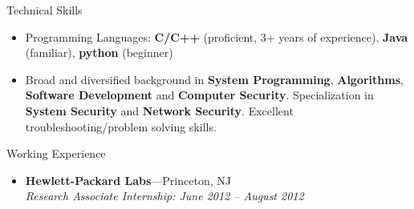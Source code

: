 \documentclass[11pt,oneside]{article}
\newenvironment{ressection}[1]{
	\vspace{4pt}
	{\fontfamily{phv}\selectfont\Large#1}
	\begin{itemize}
	\vspace{3pt}
}{
	\end{itemize}
}
\newcommand{\resitem}[1]{
	\vspace{-4pt}
	\item \begin{flushleft} #1 \end{flushleft}
}
\newcommand{\resbigitem}[3]{
	\vspace{-5pt}
	\item
	\textbf{#1}---#2 \\
	\textit{#3}
}
\newenvironment{ressubsec}[3]{
	\resbigitem{#1}{#2}{#3}
	\vspace{-2pt}
	\begin{itemize}
}{
	\end{itemize}
}
\begin{document}
\begin{ressection}{Technical Skills}
	\resitem{
		Programming Languages: \textbf{C/C++ }(proficient, 3+ years of experience), \textbf{Java} (familiar), \textbf{python} (beginner)
	}
	\resitem{Broad and diversified background in \textbf{System Programming},
		\textbf{Algorithms}, \textbf{Software Development} and
			\textbf{Computer Security}. Specialization in \textbf{System
				Security} and \textbf{Network Security}. Excellent troubleshooting/problem solving skills.
	}

\end{ressection}


\begin{ressection}{Working Experience}
	\begin{ressubsec}{Hewlett-Packard Labs}{Princeton, NJ}{Research Associate Internship: June 2012 -- August 2012}
	\end{ressubsec}
\end{ressection}
\end{document}
